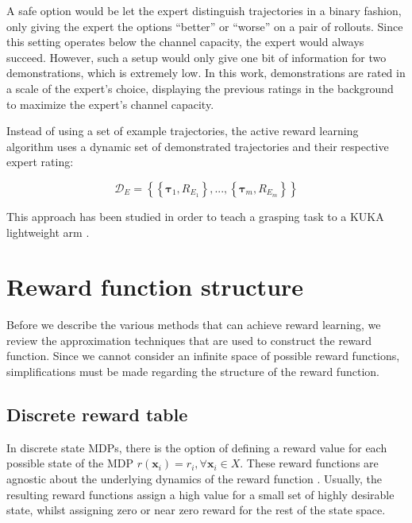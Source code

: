 \documentclass[mscThesis.tex]{subfiles}
\begin{document}
A safe option would be let the expert distinguish trajectories in a binary fashion, only giving the expert the options ``better'' or ``worse'' on a pair of rollouts. Since this setting operates below the channel capacity, the expert would always succeed. However, such a setup would only give one bit of information for two demonstrations, which is extremely low. In this work, demonstrations are rated in a scale of the expert's choice, displaying the previous ratings in the background to maximize the expert's channel capacity.

Instead of using a set of example trajectories, the active reward learning algorithm uses a dynamic set of demonstrated trajectories and their respective expert rating: 

\begin{equation*}
    \mathcal{D}_E = \left\{ \left\{ \bm{\tau}_1, R_{E_1} \right\}, ..., \left\{ \bm{\tau}_m, R_{E_m} \right\} \right\}
\end{equation*}

This approach has been studied in order to teach a grasping task to a KUKA lightweight arm \cite{Daniel2015}.

\section{Reward function structure}
\label{sec:rewardstruct}
Before we describe the various methods that can achieve reward learning, we review the approximation techniques that are used to construct the reward function. Since we cannot consider an infinite space of possible reward functions, simplifications must be made regarding the structure of the reward function. 

\subsection{Discrete reward table}
In discrete state MDPs, there is the option of defining a reward value for each possible state of the MDP $r( \bm{x}_i) = r_{i},  \forall  \bm{x}_i \in X $. These reward functions are agnostic about the underlying dynamics of the reward function \cite{AbbeelRussel2000} \cite{RamachandranAmir2007}. Usually, the resulting reward functions assign a high value for a small set of highly desirable state, whilst assigning zero or near zero reward for the rest of the state space. 
\end{document}
